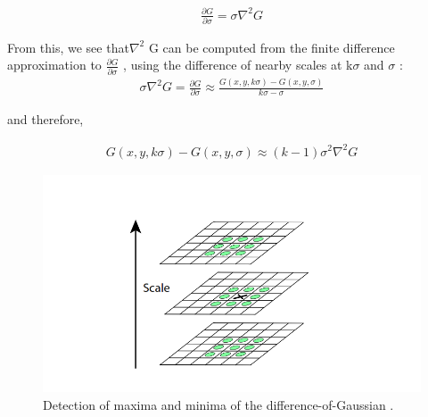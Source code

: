\begin{align}
    \frac {\partial G} {\partial \sigma} = \sigma \nabla^2 G 
\end{align}




From this, we see that$\nabla^2$ G can be computed from the finite difference approximation to  $\frac{\partial G}{\partial \sigma }$ , using the difference of nearby scales at k$\sigma$ and $\sigma$ :\\


\begin{align}
      \sigma \nabla^2 G =   \frac {\partial G} {\partial \sigma} \approx   \frac {G(x,y,k \sigma) -  G(x,y,\sigma)}{ k \sigma - \sigma}  
\end{align}


and therefore,


\begin{align}
      G(x,y,k \sigma) -  G(x,y,\sigma)  \approx (k - 1)  \sigma^2\nabla^2G 
\end{align}

\begin{figure}[H]
\centering
\includegraphics[width=1.0\textwidth]{img/sift2.PNG}
\caption{ Detection of maxima and minima of the difference-of-Gaussian .}
\label{fig:sift2}
\end{figure}

